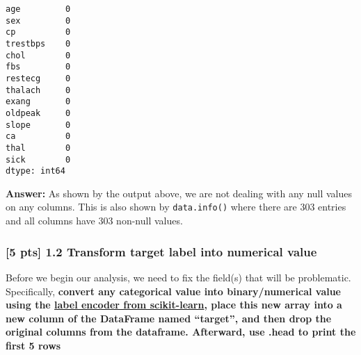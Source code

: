 \documentclass[11pt]{article}
\makeatletter
\newcommand{\boxspacing}{\kern\kvtcb@left@rule\kern\kvtcb@boxsep}
\newcommand{\prompt}[4]{
        {\ttfamily\llap{{\color{#2}[#3]:\hspace{3pt}#4}}\vspace{-\baselineskip}}
    }
\makeatother
\begin{document}
            \begin{tcolorbox}[breakable, size=fbox, boxrule=.5pt, pad at break*=1mm, opacityfill=0]
\prompt{Out}{outcolor}{6}{\boxspacing}
\begin{Verbatim}[commandchars=\\\{\}]
age         0
sex         0
cp          0
trestbps    0
chol        0
fbs         0
restecg     0
thalach     0
exang       0
oldpeak     0
slope       0
ca          0
thal        0
sick        0
dtype: int64
\end{Verbatim}
\end{tcolorbox}
        
    \textbf{Answer:} As shown by the output above, we are not dealing with
any null values on any columns. This is also shown by
\texttt{data.info()} where there are 303 entries and all columns have
303 non-null values.

    \hypertarget{pts-1.2-transform-target-label-into-numerical-value}{%
\subsubsection{{[}5 pts{]} 1.2 Transform target label into numerical
value}\label{pts-1.2-transform-target-label-into-numerical-value}}

Before we begin our analysis, we need to fix the field(s) that will be
problematic. Specifically, \textbf{convert any categorical value into
binary/numerical value using the
\href{https://scikit-learn.org/stable/modules/generated/sklearn.preprocessing.LabelEncoder.html}{label
encoder from scikit-learn}, place this new array into a new column of
the DataFrame named ``target'', and then drop the original columns from
the dataframe. Afterward, use .head to print the first 5 rows}
\end{document}
